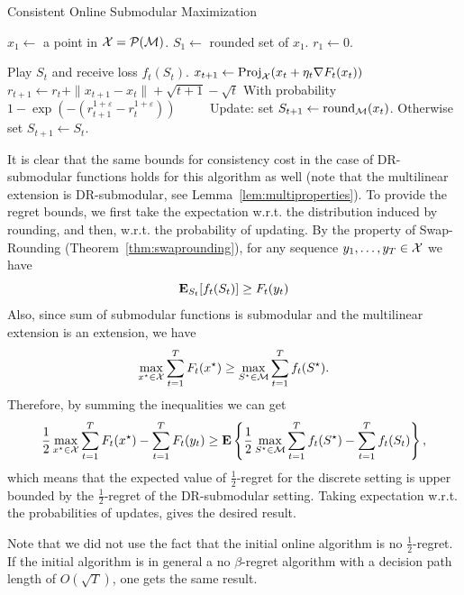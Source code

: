 \begin{algorithm}[ht] 
\caption{Consistent Online Submodular Maximization}
\label{alg:submod_algo}
\begin{algorithmic}
    \STATE $x_1 \leftarrow$ a point in $\mathcal{X} = \mathcal{P}(\mathcal{M})$.
  \STATE $S_1 \leftarrow$ rounded set of $x_1$.
  \STATE $r_1 \leftarrow 0$.

  \STATE Play $S_t$ and receive loss $f_t(S_t)$. 
  \STATE $x_{t+1} \leftarrow \mathrm{Proj}_{\mathcal{X}}(x_t + \eta_t \nabla F_t(x_t))$
  \STATE $r_{t+1} \leftarrow r_t + \|x_{t+1} - x_t\| + \sqrt{t+1} - \sqrt{t}$
  \STATE With probability $1 - \exp(-(r_{t+1}^{1+\varepsilon}- r_{t}^{1+\varepsilon}))$
  \STATE $\qquad$ Update: set $S_{t+1} \leftarrow \mathrm{round}_{\mathcal{M}}(x_t)$.
  \STATE Otherwise set $S_{t+1} \leftarrow S_t$.
  \ENDFOR
\end{algorithmic}
\end{algorithm}

It is clear that the same bounds for consistency cost in the case of DR-submodular functions holds for this algorithm as well (note that the multilinear extension is DR-submodular, see Lemma~\ref{lem:multiproperties}). To provide the regret bounds, we first take the expectation w.r.t. the distribution induced by rounding, and then, w.r.t. the probability of updating. By the property of Swap-Rounding (Theorem~\ref{thm:swaprounding}), for any sequence $y_1, \ldots, y_T \in \mathcal{X}$ we have
\[
    \mathbf{E}_{S_t}[f_t(S_t)] \geq F_t(y_t)
\]
Also, since sum of submodular functions is submodular and the multilinear extension is an extension, we have
\[
    \max_{x^\star\in \mathcal{X}} \sum_{t=1}^T F_t(x^\star) \geq \max_{S^\star\in \mathcal{M}} \sum_{t=1}^T f_t(S^\star).
\]
Therefore, by summing the inequalities we can get
\begin{align*}
    \frac{1}{2}\max_{x^\star\in \mathcal{X}} \sum_{t=1}^T F_t(x^\star) - \sum_{t=1}^T F_t(y_t) \geq \mathbf{E}\left\{ \frac{1}{2}\max_{S^\star\in \mathcal{M}} \sum_{t=1}^T f_t(S^\star) - \sum_{t=1}^T f_t(S_t) \right\},
\end{align*}
which means that the expected value of $\frac{1}{2}$-regret for the discrete setting is upper bounded by the $\frac{1}{2}$-regret of the DR-submodular setting. Taking expectation w.r.t. the probabilities of updates, gives the desired result.

\begin{remark}
    Note that we did not use the fact that the initial online algorithm is no $\frac{1}{2}$-regret. If the initial algorithm is in general a no $\beta$-regret algorithm with a decision path length of $O(\sqrt{T})$, one gets the same result.
\end{remark} 


